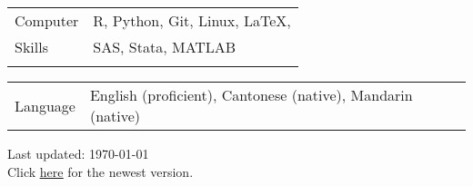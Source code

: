 \documentclass[letterpaper, 11pt]{article}
\begin{document}
\noindent \begin{tabular}{@{} p{3cm} l}
	\Large{Computer}  & R, Python, Git, Linux, \LaTeX,   \\
	\Large{Skills}    & SAS, Stata, MATLAB \\
	& \\
\end{tabular}





\noindent \begin{tabular}{@{} p{3cm} l}
	\Large{Language}  & English (proficient), Cantonese (native), Mandarin (native)   \\
\end{tabular}





\vspace{1cm}

\begin{center}
  \begin{footnotesize}
    Last updated: \today \\
    Click \href{https://jiachenghe.github.io/files/cv/CV.pdf}{\underline{here}} for the newest version.
  \end{footnotesize}
\end{center}
\end{document}
